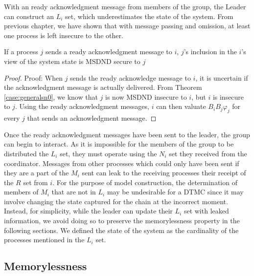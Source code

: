 With an ready acknowledgment message from members of the group, the Leader can construct an $L_i$ set, which underestimates the state of the system.
From previous chapter, we have shown that with message passing and omission, at least one process is left insecure to the other.

\begin{thm}
    If a process $j$ sends a ready acknowledgment message to $i$, $j$'s inclusion in the $i$'s view of the system state is MSDND secure to $j$
\end{thm}

\begin{proof}
Proof: When $j$ sends the ready acknowledge message to $i$, it is uncertain if the acknowledgment message is actually delivered.
From Theorem \ref{case:generalsn0}, we know that $j$ is now MSDND insecure to $i$, but $i$ is insecure to $j$.
Using the ready acknowledgment messages, $i$ can then valuate $B_i B_j \varphi_j$ for every $j$ that sends an acknowledgment message.
\end{proof}

Once the ready acknowledgment messages have been sent to the leader, the group can begin to interact.
As it is impossible for the members of the group to be distributed the $L_i$ set, they must operate using the $N_i$ set they received from the coordinator.
Messages from other processes which could only have been sent if they are a part of the $M_i$ sent can leak to the receiving processes their receipt of the $R$ set from $i$.
For the purpose of model construction, the determination of members of $M_i$ that are not in $L_i$ may be undesirable for a \ac{DTMC} since it may involve changing the state captured for the chain at the incorrect moment.
Instead, for simplicity, while the leader can update their $L_i$ set with leaked information, we avoid doing so to preserve the memorylessness property in the following sections.
We defined the state of the system as the cardinality of the processes mentioned in the $L_i$ set.



\subsection{Memorylessness}


